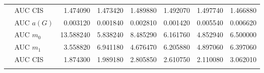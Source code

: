 \begin{table}[htbp]
\begin{tabular}{llrrrrrr}
    & AUC CIS & 1.474090 & 1.473420 & 1.489880 & 1.492070 & 1.497740 & 1.466880 \\
    \addlinespace
    \multirow{4}{*}{random} & AUC $a(G)$ & 0.003120 & 0.001840 & 0.002810 & 0.001420 & 0.005540 & 0.006620 \\
    & AUC $m_0$ & 13.588240 & 5.838240 & 8.485290 & 6.161760 & 4.852940 & 6.500000 \\
    & AUC $m_1$ & 3.558820 & 6.941180 & 4.676470 & 6.205880 & 4.897060 & 6.397060 \\
    & AUC CIS & 1.874300 & 1.989180 & 2.805850 & 2.610750 & 2.110080 & 3.062010 \\
    \addlinespace
    \bottomrule
  \end{tabular}
\end{table}

